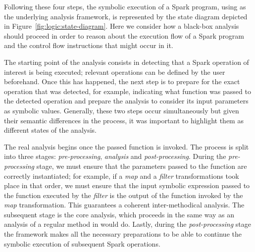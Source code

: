 \label{sec:conceptual-process}






Following these four steps, the symbolic execution of a Spark program, using \spf{} as the underlying analysis framework, is represented by the state diagram depicted in Figure~\ref{fig:logic:state-diagram}. Here we consider how a black-box analysis should proceed in order to reason about the execution flow of a Spark program and the control flow instructions that might occur in it.

The starting point of the analysis consists in detecting that a Spark operation of interest is being executed; relevant operations can be defined by the user beforehand. Once this has happened, the next step is to prepare for the exact operation that was detected, for example, indicating what function was passed to the detected operation and prepare the \spf{} analysis to consider its input parameters as symbolic values. Generally, these two steps occur simultaneously but given their semantic differences in the process, it was important to highlight them as different states of the analysis.

The real analysis begins once the passed function is invoked. The process is split into three stages: \textit{pre-processing}, \textit{analysis} and \textit{post-processing}. During the \textit{pre-processing} stage, we must ensure that the parameters passed to the function are correctly instantiated; for example, if a \textit{map} and a \textit{filter} transformations took place in that order, we must ensure that the input symbolic expression passed to the function executed by the \textit{filter} is the output of the function invoked by the \textit{map} transformation. This guarantees a coherent inter-methodical analysis. The subsequent stage is the core analysis, which proceeds in the same way as an analysis of a regular method in \spf{} would do. Lastly, during the \textit{post-processing} stage the framework makes all the necessary preparations to be able to continue the symbolic execution of subsequent Spark operations.

